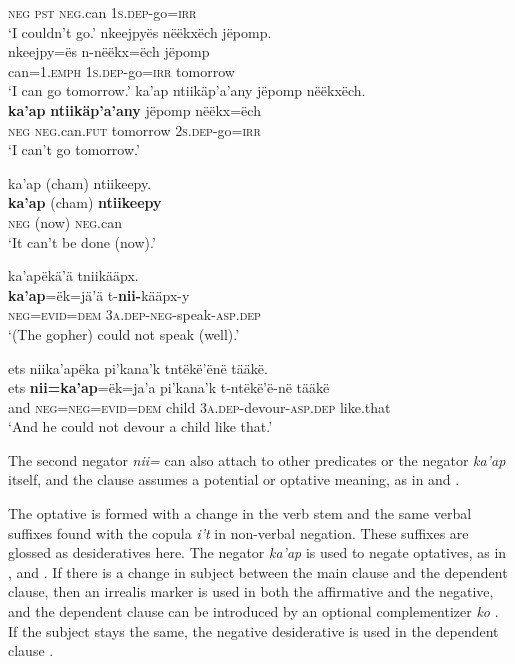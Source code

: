 \documentclass[output=paper,colorlinks,citecolor=brown,draft]{langscibook}
\begin{document}
             \textsc{neg} \textsc{pst} \textsc{neg}.can \textsc{1s.dep}{}-go=\textsc{irr}\\
        \glt ‘I couldn’t go.’
    \ex\label{ex:mix:89g}
        \glll nkeejpyës nëëkxëch jëpomp. \\
             nkeejpy=ës n-nëëkx=ëch jëpomp\\
             can=1.\textsc{emph} \textsc{1s.dep}{}-go=\textsc{irr} tomorrow\\
        \glt  ‘I can go tomorrow.’
    \ex\label{ex:mix:89h}
        \glll  ka’ap ntiikäp’a’any jëpomp nëëkxëch. \\ 
             \textbf{ka’ap} \textbf{ntiikäp’a’any} jëpomp nëëkx=ëch \\
             \textsc{neg} \textsc{neg}.can.\textsc{fut} tomorrow \textsc{2s.dep}{}-go=\textsc{irr} \\
        \glt ‘I can’t go tomorrow.’
    \z
\z 

\ea\label{ex:mix:90}
    \glll ka’ap (cham) ntiikeepy.\\
        \textbf{ka’ap} (cham) \textbf{ntiikeepy} \\
        \textsc{neg} (now) \textsc{neg}.can \\
    \glt ‘It can’t be done (now).’
\z

\ea\label{ex:mix:91}
    \glll ka’apëkä’ä tniikääpx.\\
          \textbf{ka’ap}=ëk=jä’ä t-\textbf{nii-}kääpx-y \\
          \textsc{neg=evid=dem} 3\textsc{a.dep-neg}{}-speak-\textsc{asp.dep} \\
    \glt ‘(The gopher) could not speak (well).’
\z

\ea\label{ex:mix:92}
    \glll ets niika’apëka pi’kana’k tntëkë’ënë tääkë. \\
          ets \textbf{nii=ka’ap}=ëk=ja’a pi’kana’k t{}-ntëkë’ë-në tääkë \\
          and \textsc{neg=neg=evid=dem} child \textsc{3a.dep}{}-devour-\textsc{asp.dep} like.that  \\
    \glt ‘And he could not devour a child like that.’
\z

The second negator \textit{nii=} can also attach to other predicates or the negator \textit{ka’ap} itself, and the clause assumes a potential or optative meaning, as in  and . 

The optative is formed with a change in the verb stem and the same verbal suffixes found with the copula \textit{i’t} in non-verbal negation. These suffixes are glossed as desideratives here. The negator \textit{ka’ap} is used to negate optatives, as in ,  and . If there is a change in subject between the main clause and the dependent clause, then an irrealis marker is used in both the affirmative and the negative, and the dependent clause can be introduced by an optional complementizer \textit{ko} . If the subject stays the same, the negative desiderative is used in the dependent clause .
\end{document}
